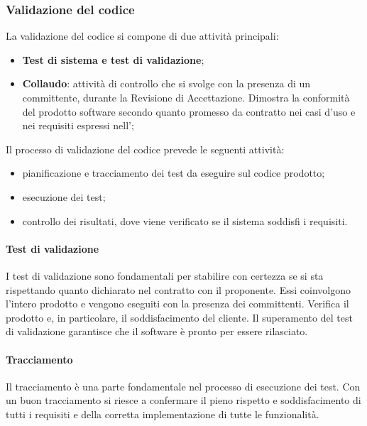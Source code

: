 \subsubsection{Validazione del codice}
La validazione del codice si compone di due attività principali:
\begin{itemize}
\item \textbf{Test di sistema e test di validazione};
\item \textbf{Collaudo}: attività di controllo che si svolge con la presenza di un committente, durante la Revisione di Accettazione. Dimostra la conformità del prodotto software secondo quanto promesso da contratto nei casi d’uso e nei requisiti espressi nell’\AdR ;
\end{itemize}

Il processo di validazione del codice prevede le seguenti attività:
\begin{itemize}
\item pianificazione e tracciamento dei test da eseguire sul codice prodotto;
\item esecuzione dei test;
\item controllo dei risultati, dove viene verificato se il sistema soddisfi i requisiti.
\end{itemize}

\paragraph{Test di validazione}
I test di validazione sono fondamentali per stabilire con certezza se si sta rispettando
quanto dichiarato nel contratto con il proponente. Essi coinvolgono l'intero prodotto e vengono eseguiti con la presenza dei committenti. Verifica il prodotto e, in particolare,
il soddisfacimento del cliente. Il superamento del test di validazione garantisce che il software è pronto per essere rilasciato.

\paragraph{Tracciamento}
Il tracciamento è una parte fondamentale nel processo di esecuzione dei test. Con un buon tracciamento si riesce a confermare il pieno rispetto e soddisfacimento di tutti i requisiti e della corretta implementazione di tutte le funzionalità.


